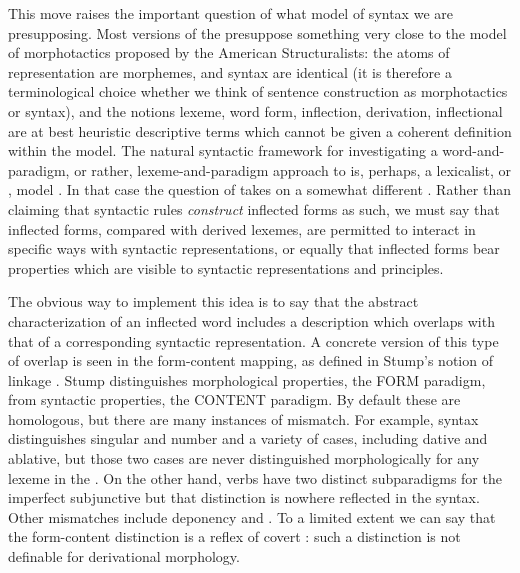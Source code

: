 \documentclass[output=paper,
modfonts
]{LSP/langsci}
\begin{document}
  \newpage 
This move raises the important question of what model of syntax we are presupposing. Most versions of the 
presuppose something very close to the model of morphotactics proposed by the American Structuralists:
the atoms of representation are morphemes,  and syntax are identical (it is therefore a terminological choice whether we think of sentence construction as morphotactics or syntax), and the notions lexeme, word form, inflection, derivation, inflectional  are at best heuristic descriptive terms which cannot be given a coherent definition within the model. The natural syntactic framework for investigating a word-and-paradigm, or rather, lexeme-and-paradigm approach to  is, perhaps, a lexicalist, or ,
model \parencite{Miller:Sag97,Sadler:Spencer01,Sadler:Nordlinger06:stacking}. %
 In that case the question of  takes on a somewhat different . Rather than claiming that syntactic rules \emph{construct} inflected forms as such, we must say that inflected forms, compared with derived lexemes, are permitted to  interact in specific ways with syntactic representations, or equally that inflected forms bear properties which are visible to syntactic representations and principles. 
 
 The obvious way to implement this idea is to say that the abstract characterization of an inflected word includes a  description which overlaps with that of a corresponding syntactic representation. A concrete version of this type of overlap is seen in the form-content mapping, as defined in Stump’s notion of  linkage %
 \parencite{Spencer:Stump13:Hungproncase, Stewart:Stump07,Stump02:paradigmlinkage,Stump06:heteroclisis,Stump16:book,Stump16:MorphMetatheory}.	%
Stump distinguishes morphological properties, the FORM paradigm, from syntactic properties, the CONTENT paradigm. By default these are homologous, but there are many instances of mismatch. For example,  syntax distinguishes singular and  number and a variety of cases, including dative and ablative, but those two cases are never distinguished morphologically for any lexeme in the . On the other hand,  verbs have two distinct subparadigms for the imperfect subjunctive but that distinction is nowhere reflected in the syntax. Other mismatches include deponency and . To a limited extent we can say that the form-content  distinction is a reflex of covert : such a distinction is not definable for derivational morphology. 
 
\end{document}
